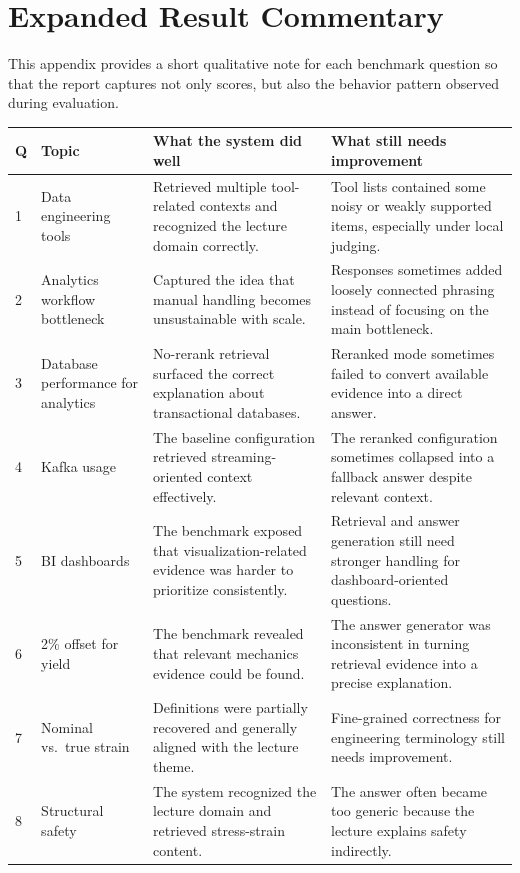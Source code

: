 \documentclass[12pt,a4paper,oneside]{report}
\begin{document}
\chapter{Expanded Result Commentary}
This appendix provides a short qualitative note for each benchmark question so that the report captures not only scores, but also the behavior pattern observed during evaluation.

\begin{longtable}{p{} p{} p{} p{}}
\toprule
\textbf{Q} & \textbf{Topic} & \textbf{What the system did well} & \textbf{What still needs improvement} \\
\midrule
1 & Data engineering tools & Retrieved multiple tool-related contexts and recognized the lecture domain correctly. & Tool lists contained some noisy or weakly supported items, especially under local judging. \\
2 & Analytics workflow bottleneck & Captured the idea that manual handling becomes unsustainable with scale. & Responses sometimes added loosely connected phrasing instead of focusing on the main bottleneck. \\
3 & Database performance for analytics & No-rerank retrieval surfaced the correct explanation about transactional databases. & Reranked mode sometimes failed to convert available evidence into a direct answer. \\
4 & Kafka usage & The baseline configuration retrieved streaming-oriented context effectively. & The reranked configuration sometimes collapsed into a fallback answer despite relevant context. \\
5 & BI dashboards & The benchmark exposed that visualization-related evidence was harder to prioritize consistently. & Retrieval and answer generation still need stronger handling for dashboard-oriented questions. \\
6 & 2\% offset for yield & The benchmark revealed that relevant mechanics evidence could be found. & The answer generator was inconsistent in turning retrieval evidence into a precise explanation. \\
7 & Nominal vs.\ true strain & Definitions were partially recovered and generally aligned with the lecture theme. & Fine-grained correctness for engineering terminology still needs improvement. \\
8 & Structural safety & The system recognized the lecture domain and retrieved stress-strain content. & The answer often became too generic because the lecture explains safety indirectly. \\

\end{longtable}
\end{document}
